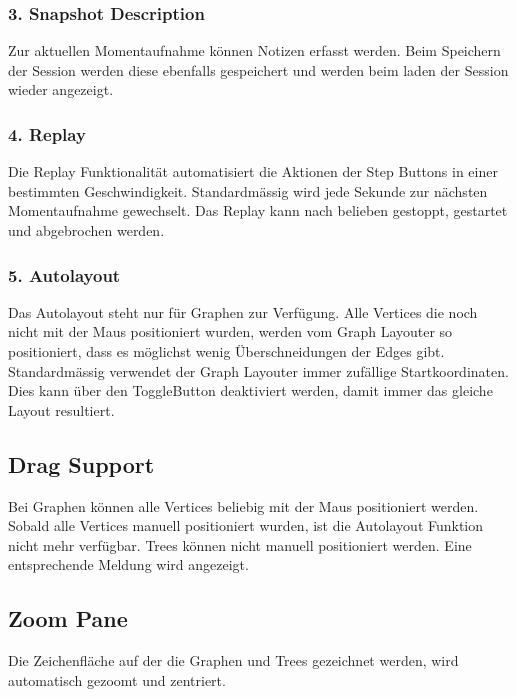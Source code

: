 \documentclass[11pt,a4paper,english,oneside]{book}
\numberwithin{equation}{chapter}
\begin{document}
	\subsubsection{3. Snapshot Description}
	Zur aktuellen Momentaufnahme können Notizen erfasst werden. Beim Speichern der Session werden diese ebenfalls gespeichert und werden beim laden der Session wieder angezeigt.
	
	\subsubsection{4. Replay}
	Die Replay Funktionalität automatisiert die Aktionen der Step Buttons in einer bestimmten Geschwindigkeit. Standardmässig wird jede Sekunde zur nächsten Momentaufnahme gewechselt. Das Replay kann nach belieben gestoppt, gestartet und abgebrochen werden.
	
	\subsubsection{5. Autolayout}
	Das Autolayout steht nur für Graphen zur Verfügung. Alle Vertices die noch nicht mit der Maus positioniert wurden, werden vom Graph Layouter so positioniert, dass es möglichst wenig Überschneidungen der Edges gibt. Standardmässig verwendet der Graph Layouter immer zufällige Startkoordinaten. Dies kann über den ToggleButton deaktiviert werden, damit immer das gleiche Layout resultiert.
	
	\subsection{Drag Support}
	Bei Graphen können alle Vertices beliebig mit der Maus positioniert werden. Sobald alle Vertices manuell positioniert wurden, ist die Autolayout Funktion nicht mehr verfügbar. Trees können nicht manuell positioniert werden. Eine entsprechende Meldung wird angezeigt.
	
	\subsection{Zoom Pane}
	Die Zeichenfläche auf der die Graphen und Trees gezeichnet werden, wird automatisch gezoomt und zentriert. 
\end{document}
